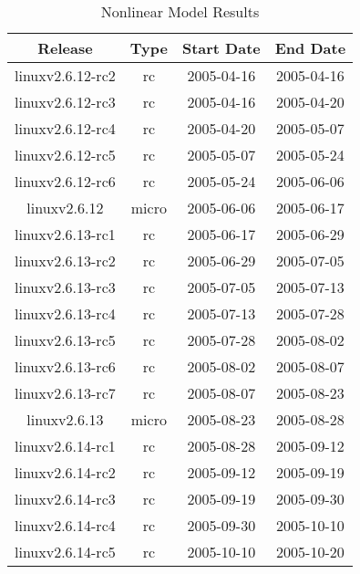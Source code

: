 \documentclass{acm_proc_article-sp}
\begin{document}
\begin{table}[ht]
\caption{Nonlinear Model Results}	 %
\centering 						%
\begin{tabular}{c c c c}				%
\hline\hline						%
Release & Type & Start Date & End Date \\ [0.5ex]
\hline 							%
linuxv2.6.12-rc2 & rc       & 2005-04-16 & 2005-04-16 \\
linuxv2.6.12-rc3 & rc       & 2005-04-16 & 2005-04-20 \\
linuxv2.6.12-rc4 & rc       & 2005-04-20 & 2005-05-07 \\
linuxv2.6.12-rc5 & rc       & 2005-05-07 & 2005-05-24 \\
linuxv2.6.12-rc6 & rc       & 2005-05-24 & 2005-06-06 \\
linuxv2.6.12        & micro & 2005-06-06 & 2005-06-17 \\
linuxv2.6.13-rc1 & rc       & 2005-06-17 & 2005-06-29 \\
linuxv2.6.13-rc2 & rc       & 2005-06-29 & 2005-07-05 \\
linuxv2.6.13-rc3 & rc       & 2005-07-05 & 2005-07-13 \\
linuxv2.6.13-rc4 & rc       & 2005-07-13 & 2005-07-28 \\
linuxv2.6.13-rc5 & rc       & 2005-07-28 & 2005-08-02 \\
linuxv2.6.13-rc6 & rc       & 2005-08-02 & 2005-08-07 \\
linuxv2.6.13-rc7 & rc       & 2005-08-07 & 2005-08-23 \\
linuxv2.6.13        & micro & 2005-08-23 & 2005-08-28 \\
linuxv2.6.14-rc1 & rc       & 2005-08-28 & 2005-09-12 \\
linuxv2.6.14-rc2 & rc       & 2005-09-12 & 2005-09-19 \\
linuxv2.6.14-rc3 & rc       & 2005-09-19 & 2005-09-30 \\
linuxv2.6.14-rc4 & rc       & 2005-09-30 & 2005-10-10 \\
linuxv2.6.14-rc5 & rc       & 2005-10-10 & 2005-10-20 \\
[1ex]							%
\hline 							%
\end{tabular}
\label{table:nonlin} 				%
\end{table}
\end{document}
